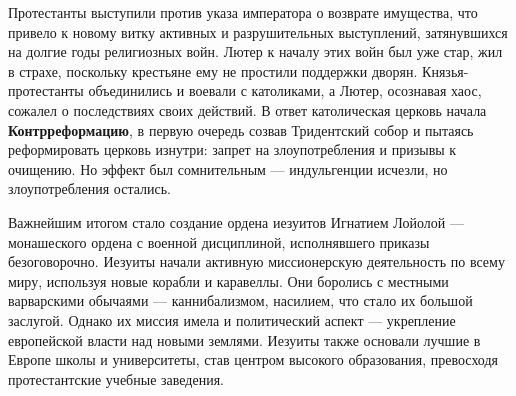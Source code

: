 Протестанты выступили против указа императора о возврате имущества, что привело к новому витку активных и разрушительных выступлений, затянувшихся на долгие годы религиозных войн. Лютер к началу этих войн был уже стар, жил в страхе, поскольку крестьяне ему не простили поддержки дворян. Князья-протестанты объединились и воевали с католиками, а Лютер, осознавая хаос, сожалел о последствиях своих действий.
В ответ католическая церковь начала \textbf{Контрреформацию}, в первую очередь созвав Тридентский собор и пытаясь реформировать церковь изнутри: запрет на злоупотребления и призывы к очищению. Но эффект был сомнительным --- индульгенции исчезли, но злоупотребления остались.

Важнейшим итогом стало создание ордена иезуитов Игнатием Лойолой --- монашеского ордена с военной дисциплиной, исполнявшего приказы безоговорочно. Иезуиты начали активную миссионерскую деятельность по всему миру, используя новые корабли и каравеллы. Они боролись с местными варварскими обычаями --- каннибализмом, насилием, что стало их большой заслугой. Однако их миссия имела и политический аспект --- укрепление европейской власти над новыми землями. Иезуиты также основали лучшие в Европе школы и университеты, став центром высокого образования, превосходя протестантские учебные заведения.

